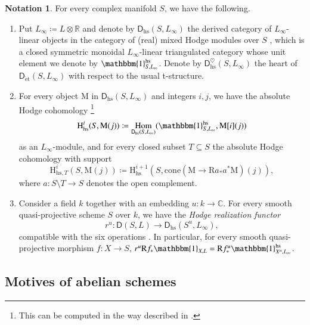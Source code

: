\documentclass[12pt]{amsart}
\numberwithin{equation}{section}
\theoremstyle{plain}
\theoremstyle{definition}
\newtheorem{notation}[proposition]{Notation}
\theoremstyle{remark}
\renewcommand{\d}[1]{\mathbb{#1}}
\renewcommand{\r}[1]{\mathrm{#1}}
\renewcommand{\sf}[1]{\mathsf{#1}}
\renewcommand{\(}{\left(}
\renewcommand{\)}{\right)}
\newcommand{\dC}{\d C}
\newcommand{\dR}{\d R}
\newcommand{\rH}{\r H}
\newcommand{\rM}{\r M}
\newcommand{\rR}{\r R}
\newcommand{\sfD}{\sf D}
\newcommand{\et}{{\acute{\r{e}}\r{t}}}
\newcommand{\hs}{\r{hs}}
\DeclareMathOperator{\Hom}{Hom}
\begin{document}
\begin{notation}\label{no:relative_motive_hodge}
For every complex manifold $S$, we have the following.
\begin{enumerate}
  \item Put $L_\infty\coloneqq L\otimes\dR$ and denote by $\sfD_\hs(S,L_\infty)$
      the derived category of $L_\infty$-linear objects in the category of (real) mixed Hodge modules over $S$ \cite{Sai90}, which is a closed symmetric monoidal $L_\infty$-linear triangulated category whose unit element we denote by $\mathbbm{1}^\hs_{S,L_\infty}$. Denote by $\sfD_\hs^\heartsuit(S,L_\infty)$ the heart of $\sfD_{\et}(S,L_\infty)$ with respect to the usual t-structure.

  \item For every object $\rM$ in $\sfD_\hs(S,L_\infty)$ and integers $i,j$, we have the absolute Hodge cohomology \footnote{This can be computed in the way described in \cite{Bei86}.}
      \[
      \rH^i_\hs(S,\rM(j))\coloneqq\Hom_{\sfD_\hs(S,L_\infty)}(\mathbbm{1}^\hs_{S,L_\infty},\rM[i](j))
      \]
      as an $L_\infty$-module, and for every closed subset $T\subseteq S$ the absolute Hodge cohomology with support
      \[
      \rH^i_{\hs,T}(S,\rM(j))\coloneqq\rH^{i+1}_{\hs}(S,\r{cone}(\rM\to\rR a_* a^*\rM)(j)),
      \]
      where $a\colon S\setminus T\to S$ denotes the open complement.

  \item Consider a field $k$ together with an embedding $u\colon k\to \dC$. For every smooth quasi-projective scheme $S$ over $k$, we have the \emph{Hodge realization functor}
      \[
      r^u\colon\sfD(S,L)\to\sfD_\hs(S^u,L_\infty),
      \]
      compatible with the six operations \cites{Ivo16,Tub25}. In particular, for every smooth quasi-projective morphism $f\colon X\to S$, $r^u\rR f_*\mathbbm{1}_{X,L}=\rR f^u_*\mathbbm{1}^\hs_{X^u,L_\infty}$.
\end{enumerate}
\end{notation}



\subsection{Motives of abelian schemes}
\label{ss:abelian_motive}
\end{document}
